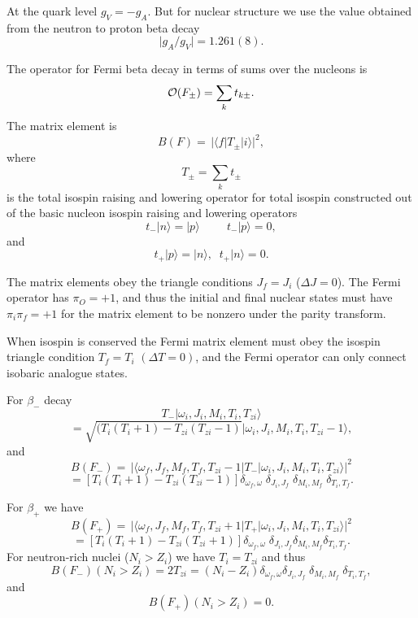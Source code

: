 \documentclass[graybox,sectrefs,envcountresetchap,open=right]{svmonodo}
\begin{document}
At the quark level $g_{V}=-g_{A}$.
But for nuclear structure we use the value obtained from the
neutron to proton beta decay
\[
     \vert g_{A}/g_{V}\vert  = 1.261(8). 
\]


The operator for Fermi beta decay in terms of sums
over the nucleons is
\[
{\cal O}(F_{\pm}) =  \displaystyle\sum _{k} t_{k\pm}.
\]
The matrix element is
\[
B(F) =\, \vert \langle f\vert  T_{\pm} \vert i\rangle\vert ^{2}, 
\]
where
\[
T_{\pm} = \sum _{k} t_{\pm}  
\]
is the total isospin raising and lowering operator for total
isospin constructed out of the
basic nucleon isospin raising and lowering operators
\[
t_{-}\vert n\rangle=\vert p\rangle \hspace{1cm} t_{-}\vert p\rangle= 0,
\]
and
\[
t_{+}\vert p\rangle=\vert n\rangle, \;\; t_{+}\vert n\rangle= 0.  
\]



The matrix elements obey the triangle
conditions $J_{f}=J_{i}$ ($\Delta J=0$). The Fermi operator has
$\pi _{O}=+1$, and thus the
initial and final nuclear states must have $\pi _{i}\pi _{f}=+1$ for
the matrix element to be
nonzero under the parity transform.

When isospin is conserved
the Fermi matrix element must obey the isospin triangle condition
$T_{f}=T_{i}$ $(\Delta T=0)$, and the Fermi operator can only connect
isobaric analogue states.



For $\beta_{-}$ decay
\[
T_{-}\vert \omega _{i},J_{i},M_{i},T_{i},T_{zi}\rangle
\]
\[
= \sqrt{(T_{i}(T_{i}+1)-T_{zi}(T_{zi}-1)}\vert \omega _{i},J_{i},M_{i},T_{i},T_{zi}-1\rangle,      
\]
and
\[
B(F_{-}) =\, \vert \langle \omega _{f},J_{f},M_{f},T_{f},T_{zi}-1\vert T_{-}\vert \omega 
_{i},J_{i},M_{i},T_{i},T_{zi}\rangle\vert ^{2}
\]
\[
= [T_{i}(T_{i}+1)-T_{zi}(T_{zi}-1)]
\delta _{\omega _{f},\omega }\;\delta _{J_{i},J_{f}}\;\delta _{M_{i},M_{f}}\;\delta _{T_{i},T_{f}}. 
\]


For $\beta_{ + }$ we have
\[
B(F_{+}) =\, \vert \langle \omega _{f},J_{f},M_{f},T_{f},T_{zi}+1\vert T_{+}\vert \omega 
_{i},J_{i},M_{i},T_{i},T_{zi}\rangle\vert ^{2}
\]
\[
= [T_{i}(T_{i}+1)-T_{zi}(T_{zi}+1)]
\delta _{\omega _{f},\omega }\;\delta _{J_{i},J_{f}}\delta _{M_{i},M_{f}}\delta _{T_{i},T_{f}}. 
\]
For neutron-rich nuclei ($N_{i}> Z_{i}$) we have $T_{i}=T_{zi}$ and thus
\[
B(F_{-})(N_{i}> Z_{i}) = 2T_{zi} = (N_{i}-Z_{i})\delta _{\omega _{f},\omega }\delta _{J_{i},J_{f}}\;\delta _{M_{i},M_{f}}\;\delta _{T_{i},T_{f}}, 
\]
and
\[
B(F_{+})(N_{i}> Z_{i}) = 0. 
\]
\end{document}
